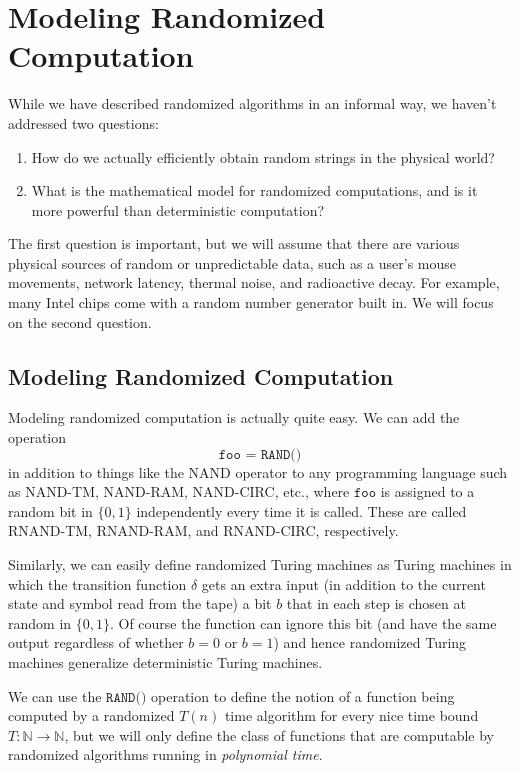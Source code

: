 \documentclass[a4paper, 12pt]{report}
\theoremstyle{remark}
\theoremstyle{definition}
\begin{document}
\section{Modeling Randomized Computation}
While we have described randomized algorithms in an informal way, we haven't addressed two questions: 
\begin{enumerate}
    \item How do we actually efficiently obtain random strings in the physical world? 
    \item What is the mathematical model for randomized computations, and is it more powerful than deterministic computation? 
\end{enumerate}
The first question is important, but we will assume that there are various physical sources of random or unpredictable data, such as a user's mouse movements, network latency, thermal noise, and radioactive decay. For example, many Intel chips come with a random number generator built in. We will focus on the second question. 

\subsection{Modeling Randomized Computation}
Modeling randomized computation is actually quite easy. We can add the operation
\[\texttt{foo = RAND()}\]
in addition to things like the NAND operator to any programming language such as NAND-TM, NAND-RAM, NAND-CIRC, etc., where $\texttt{foo}$ is assigned to a random bit in $\{0,1\}$ independently every time it is called. These are called RNAND-TM, RNAND-RAM, and RNAND-CIRC, respectively. 

Similarly, we can easily define randomized Turing machines as Turing machines in which the transition function $\delta$ gets an extra input (in addition to the current state and symbol read from the tape) a bit $b$ that in each step is chosen at random in $\{0, 1\}$. Of course the function can ignore this bit (and have the same output regardless of whether $b = 0$ or $b= 1$) and hence randomized Turing machines generalize deterministic Turing machines. 

We can use the $\texttt{RAND()}$ operation to define the notion of a function being computed by a randomized $T(n)$ time algorithm for every nice time bound $T: \mathbb{N} \longrightarrow \mathbb{N}$, but we will only define the class of functions that are computable by randomized algorithms running in \textit{polynomial time}. 
\end{document}
